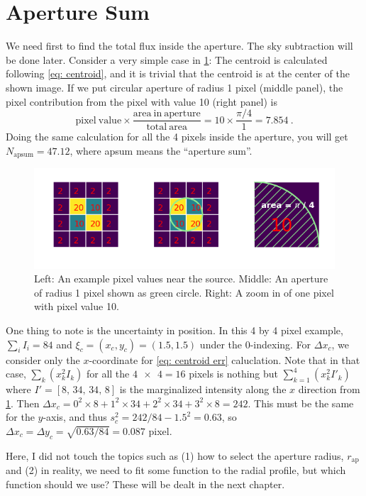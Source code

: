\section{Aperture Sum}
We need first to find the total flux inside the aperture. The sky subtraction will be done later. Consider a very simple case in \cref{fig:photapex01}: The centroid is calculated following \cref{eq: centroid}, and it is trivial that the centroid is at the center of the shown image. If we put circular aperture of radius 1 pixel (middle panel), the pixel contribution from the pixel with value 10 (right panel) is
\begin{equation}
  \mathrm{pixel~value} \times \frac{\mathrm{area~in~aperture}}{\mathrm{total~area}}
  = 10 \times \frac{\pi / 4}{1}
  = 7.854 ~.
\end{equation}
Doing the same calculation for all the 4 pixels inside the aperture, you will get $ N_\mathrm{apsum} = 47.12 $, where apsum means the ``aperture sum''. 

\begin{figure} [ht!]
\centering
\includegraphics[width=0.7\linewidth]{figs/phot_ap_ex01}
\caption{Left: An example pixel values near the source. Middle: An aperture of radius 1 pixel shown as green circle. Right: A zoom in of one pixel with pixel value 10.}
\label{fig:photapex01}
\end{figure}

One thing to note is the uncertainty in position. In this 4 by 4 pixel example, $ \sum_i I_i = 84 $ and $ \xi_c = (x_c, y_c) = (1.5, 1.5) $ under the 0-indexing. For $ \Delta x_c $, we consider only the $ x $-coordinate for \cref{eq: centroid err} caluclation. Note that in that case, $ \sum_k (x_k^2 I_k) $ for all the $ \num{4 x 4} = 16 $ pixels is nothing but $ \sum_{k=1}^{4} (x_k^2 I'_k) $ where $ I' = [8,\, 34,\, 34,\, 8] $ is the marginalized intensity along the $ x $ direction from \cref{fig:photapex01}. Then $ \Delta x_c = 0^2 \times 8 + 1^2 \times 34 + 2^2 \times 34 + 3^2 \times 8 = 242 $. This must be the same for the $ y $-axis, and thus $ s_c^2 = 242 / 84 - 1.5^2 = 0.63 $, so $ \Delta x_c = \Delta y_c = \sqrt{0.63 / 84} = 0.087 $ pixel.

Here, I did not touch the topics such as (1) how to select the aperture radius, $ r_\mathrm{ap} $ and (2) in reality, we need to fit some function to the radial profile, but which function should we use? These will be dealt in the next chapter.

